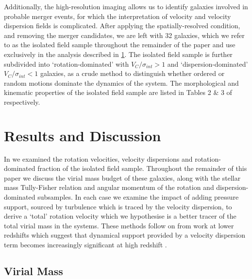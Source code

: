 \documentclass[fleqn,usenatbib]{mnras}
\begin{document}
\noindent
Additionally, the high-resolution imaging allows us to identify galaxies involved in probable merger events, for which the interpretation of velocity and velocity dispersion fields is complicated.
After applying the spatially-resolved condition, and removing the merger candidates, we are left with 32 galaxies, which we refer to as the isolated field sample throughout the remainder of the paper and use exclusively in the analysis described in \cref{sec:results}.
The isolated field sample is further subdivided into `rotation-dominated' with $V_{C}/\sigma_{int} > 1$ and `dispersion-dominated' $V_{C}/\sigma_{int} < 1$ galaxies, as a crude method to distinguish whether ordered or random motions dominate the dynamics of the system.
The morphological and kinematic properties of the isolated field sample are listed in Tables 2 $\&$ 3 of \cite{Turner2017} respectively.

\section{Results and Discussion}\label{sec:results}
In \cite{Turner2017} we examined the rotation velocities, velocity dispersions and rotation-dominated fraction of the isolated field sample.
Throughout the remainder of this paper we discuss the virial mass budget of these galaxies, along with the stellar mass Tully-Fisher relation and angular momentum of the rotation and dispersion-dominated subsamples.
In each case we examine the impact of adding pressure support, sourced by turbulence which is traced by the velocity dispersion, to derive a `total' rotation velocity which we hypothesise is a better tracer of the total virial mass in the systems.
These methods follow on from work at lower redshifts which suggest that dynamical support provided by a velocity dispersion term becomes increasingly significant at high redshift \citep[e.g.][]{Burkert2010,Newman2013,Wuyts2016b,Ubler2017}.  

\subsection{Virial Mass}\label{subsec:dynamical_masses}
\end{document}
